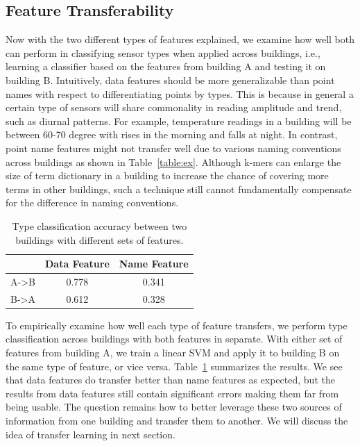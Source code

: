 \subsection{Feature Transferability}
Now with the two different types of features explained, we examine how well both can perform in classifying sensor types when applied across buildings, i.e., learning a classifier based on the features from building A and testing it on building B. 
Intuitively, data features should be more generalizable than point names with respect to differentiating points by types. 
This is because in general a certain type of sensors will share commonality in reading amplitude and trend, such as diurnal patterns. 
For example, temperature readings in a building will be between 60-70 degree with rises in the morning and falls at night.
In contrast, point name features might not transfer well due to various naming conventions across buildings as shown in Table~\ref{table:ex}.
Although k-mers can enlarge the size of term dictionary in a building to increase the chance of covering more terms in other buildings, such a technique still cannot fundamentally compensate for the difference in naming conventions.

\begin{table}[h]
\centering
\begin{tabular}{l|c|c}
\hline
                & Data Feature & Name Feature \\ \hline
A-\textgreater B & 0.778       & 0.341       \\
B-\textgreater A & 0.612       & 0.328       \\ \hline
\end{tabular}
\caption{Type classification accuracy between two buildings with different sets of features.}
\label{table:clf}
\end{table}


To empirically examine how well each type of feature transfers, we perform type classification across buildings with both features in separate. With either set of features from building A, we train a linear SVM and apply it to building B on the same type of feature, or vice versa. Table~\ref{table:clf} summarizes the results.
We see that data features do transfer better than name features as expected, but the results from data features still contain significant errors making them far from being usable. 
The question remains how to better leverage these two sources of information from one building and transfer them to another.
We will discuss the idea of transfer learning in next section.

